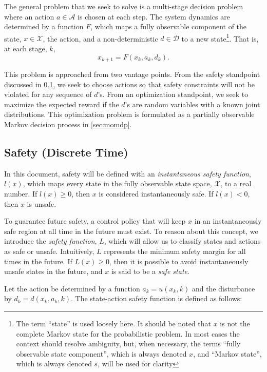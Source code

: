 \documentclass{article}
\newcommand{\aspace}{\ensuremath{\mathcal{A}} }
\begin{document}
The general problem that we seek to solve is a multi-stage decision problem where an action $a \in \aspace$ is chosen at each step.
The system dynamics are determined by a function $F$, which maps a fully observable component of the state, $x \in \mathcal{X}$, the action, and a non-deterministic $d \in \mathcal{D}$ to a new state\footnote{The term ``state'' is used loosely here. It should be noted that $x$ is not the complete Markov state for the probabilistic problem. In most cases the context should resolve ambiguity, but, when necessary, the terms ``fully observable state component'', which is always denoted $x$, and ``Markov state'', which is always denoted $s$, will be used for clarity}.
That is, at each stage, $k$,
\begin{equation}
    x_{k+1} = F(x_k, a_k, d_k) \text{.}
\end{equation}

This problem is approached from two vantage points.
From the safety standpoint discussed in \cref{sec:safety}, we seek to choose actions so that safety constraints will not be violated for any sequence of $d$'s.
From an optimization standpoint, we seek to maximize the expected reward if the $d$'s are random variables with a known joint distributions.
This optimization problem is formulated as a partially observable Markov decision process in \cref{sec:momdp}.

\subsection{Safety (Discrete Time)} \label{sec:safety}

In this document, safety will be defined with an \emph{instantaneous safety function}, $l(x)$, which maps every state in the fully observable state space, $\mathcal{X}$, to a real number.
If $l(x) \geq 0$, then $x$ is considered instantaneously safe. If $l(x) < 0$, then $x$ is unsafe.

To guarantee future safety, a control policy that will keep $x$ in an instantaneously safe region at all time in the future must exist.
To reason about this concept, we introduce the \emph{safety function}, $L$, which will allow us to classify states and actions as safe or unsafe.
Intuitively, $L$ represents the minimum safety margin for all times in the future.
If $L(x) \geq 0$, then it is possible to avoid instantaneously unsafe states in the future, and $x$ is said to be a \emph{safe state}.  

Let the action be determined by a function $a_k = u(x_k, k)$ and the disturbance by $d_k = d(x_k, a_k, k)$.
The state-action safety function is defined as follows:
\end{document}
